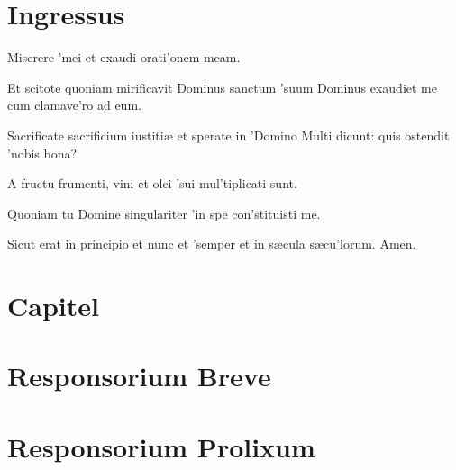 \documentclass[initial=ZallmanCaps,staff=19,font=greciliae,11pt,a4paper,openany,twoside,choralsign=PfefferMediaeval]{gregorian}
\begin{document}
\section*{Ingressus}
\newpage
{}
\par
\begin{multicols}{2}\setlength{\columnseprule}{0.2px}
Miserere 'mei \grestar{} et exaudi orati'onem meam.\par
{}\par
Et scitote quoniam mirificavit Dominus sanctum 'suum \grestar{} Dominus exaudiet me cum clamave'ro ad eum.\par
{}\par
Sacrificate sacrificium iustitiæ \gredagger{} et sperate in 'Domino \grestar{} Multi dicunt: quis ostendit 'nobis bona?\par
{}\par
A fructu frumenti, vini et olei 'sui \grestar{} mul'tiplicati sunt.\par
{}\par
Quoniam tu Domine singulariter 'in spe \grestar{} con'stituisti me.\par
{}\par
Sicut erat in principio et nunc et 'semper \grestar{} et in sæcula sæcu'lorum. Amen.
\end{multicols}\par
\section*{Capitel}
\newpage
\section*{Responsorium Breve}
\par
\section*{Responsorium Prolixum}
\newpage
\end{document}
